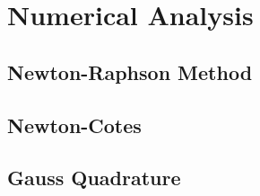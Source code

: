 \section{Numerical Analysis}
\cite{Chapra2010} \cite{Press2007}
\subsection{Newton-Raphson Method}
\subsection{Newton-Cotes}
\subsection{Gauss Quadrature}
